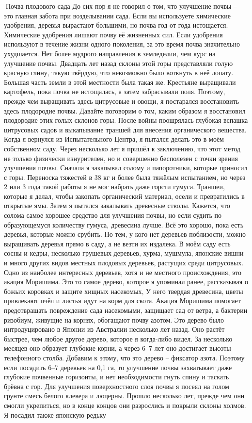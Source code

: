 \documentclass[a4paper]{book}
\begin{document}
Почва плодового сада
До сих пор я не говорил о том, что улучшение почвы – это главная забота при
возделывании сада. Если вы используете химические удобрения, деревья вырастают
большими, но почва год от года истощается. Химические удобрения лишают почву её
жизненных сил. Если удобрения используют в течение жизни одного поколения, за это время
почва значительно ухудшается.
Нет более мудрого направления в земледелии, чем курс на улучшение почвы. Двадцать
лет назад склоны этой горы представляли голую красную глину, такую твёрдую, что
невозможно было воткнуть в неё лопату. Большая часть земли в этой местности была такая
же. Крестьяне выращивали картофель, пока почва не истощалась, а затем забрасывали поля.
Поэтому, прежде чем выращивать здесь цитрусовые и овощи, я постарался восстановить
здесь плодородие почвы.
Давайте поговорим о том, каким образом я восстановил плодородие этих голых склонов
горы. После войны поощрялась глубокая вспашка цитрусовых садов и выкапывание траншей
для внесения органического вещества. Когда я вернулся из Испытательного Центра, я
пытался делать это в моём собственном саду. Через несколько лет я пришёл к заключению,
что этот метод не только физически изнурителен, но и совершенно бесполезен с точки
зрения улучшения почвы.
Сначала я закапывал солому и папоротники, которые приносил с горы. Переноска
тяжестей в 38 кг и более была тяжёлым испытанием, но через 2 или 3 года такой работы я не
мог набрать даже горсти гумуса. Траншеи, которые я делал, чтобы закопать органический
материал, осели и превратились в открытые ямы.
Затем я пытался закапывать древесные стволы. Кажется, что солома самое хорошее
средство для улучшения почвы, но если судить по образующемуся количеству гумуса,
древесина лучше. Всё это хорошо, пока есть деревья, которые можно срубить. Но тем, у кого
нет деревьев поблизости, можно выращивать деревья прямо в саду, а не везти их издалека.
В моём саду есть сосны и кедры, несколько грушевых деревьев, хурма, мушмула,
японские вишни и много других видов местных плодовых деревьев, растущих среди
цитрусовых. Одно из наиболее интересных деревьев, хотя и не местного происхождения, это
акация Моришима. Это то самое дерево, которое я упоминал ранее, рассказывая о божьих
коровках и защите хищных насекомых, У него твердая древесина, цветы привлекают пчёл и
листья идут на корм для скота. Акация Моришима помогает предотвращать повреждение
сада насекомыми, защищает сад от ветра, а бактерии ризобиум, живущие на корнях,
обогащают почву азотом.
Это дерево было интродуцировано в Японии из Австралии несколько лет назад. Оно
растёт быстрее, чем любое другое дерево, которое я когда-либо видел. За несколько месяцев
оно образует глубокие корни, а через 6–7 лет оно достигает высоты телефонного столба.
Добавим к этому, что это дерево – фиксатор азота. Поэтому если посадить 6–7 деревьев на
0,1 га, то улучшение почвы захватывает даже глубокие почвенные горизонты, и нет
необходимости гнуть спину и таскать брёвна с гор.
Для улучшения поверхностного слоя почвы я посеял на голом грунте смесь белого
клевера и люцерны. Прошло несколько лет, прежде чем они смогли укрепиться, но в конце
концов они разрослись и покрыли склоны холмов. Я посадил также японскую редьку
\end{document}
